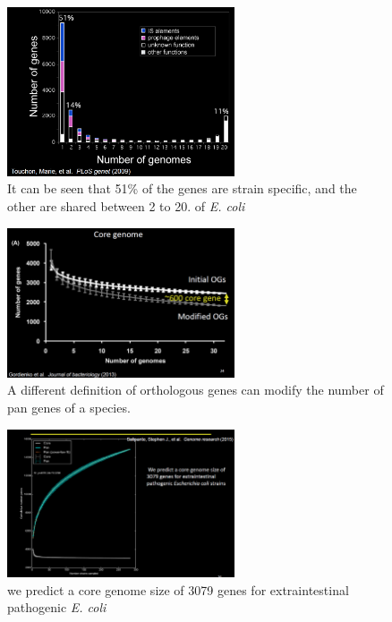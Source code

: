 \begin{figure}[h]
\caption{It can be seen that 51\% of the genes are strain specific, and the other are shared between 2 to 20.  of \emph{E. coli}}
\centering
\includegraphics[width=0.6\textwidth]{genesSharedDifferentGenomes}
\end{figure}



\begin{figure}[h]
\caption{A different definition of orthologous genes can modify the number of pan genes of a species. }
\centering
\includegraphics[width=0.6\textwidth]{orthologGenes}
\end{figure}



\begin{figure}[h]
\caption{we predict a core genome size of 3079 genes for extraintestinal pathogenic \emph{E. coli}}
\centering
\includegraphics[width=0.6\textwidth]{coreGenomePredict}
\end{figure}


